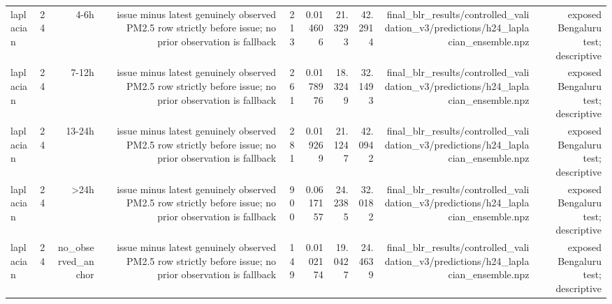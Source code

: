 \begin{tabular}{lrrrrrrrrr}
laplacian & 24 & 4-6h & issue minus latest genuinely observed PM2.5 row strictly before issue; no prior observation is fallback & 213 & 0.014606 & 21.3293 & 42.2914 & final\_blr\_results/controlled\_validation\_v3/predictions/h24\_laplacian\_ensemble.npz & exposed Bengaluru test; descriptive \\
laplacian & 24 & 7-12h & issue minus latest genuinely observed PM2.5 row strictly before issue; no prior observation is fallback & 261 & 0.0178976 & 18.3249 & 32.1493 & final\_blr\_results/controlled\_validation\_v3/predictions/h24\_laplacian\_ensemble.npz & exposed Bengaluru test; descriptive \\
laplacian & 24 & 13-24h & issue minus latest genuinely observed PM2.5 row strictly before issue; no prior observation is fallback & 281 & 0.019269 & 21.1247 & 42.0942 & final\_blr\_results/controlled\_validation\_v3/predictions/h24\_laplacian\_ensemble.npz & exposed Bengaluru test; descriptive \\
laplacian & 24 & >24h & issue minus latest genuinely observed PM2.5 row strictly before issue; no prior observation is fallback & 900 & 0.0617157 & 24.2385 & 32.0182 & final\_blr\_results/controlled\_validation\_v3/predictions/h24\_laplacian\_ensemble.npz & exposed Bengaluru test; descriptive \\
laplacian & 24 & no\_observed\_anchor & issue minus latest genuinely observed PM2.5 row strictly before issue; no prior observation is fallback & 149 & 0.0102174 & 19.0427 & 24.4639 & final\_blr\_results/controlled\_validation\_v3/predictions/h24\_laplacian\_ensemble.npz & exposed Bengaluru test; descriptive \\
\hline
\end{tabular}
